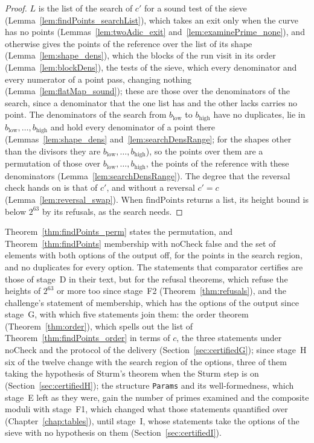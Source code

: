 \begin{proof}
  \leanok
  $L$ is the list of the search of $c'$ for a sound test of the sieve
  (Lemma~\ref{lem:findPoints_searchList}), which takes an exit only when the curve has no points
  (Lemmas~\ref{lem:twoAdic_exit} and~\ref{lem:examinePrime_none}), and otherwise gives the points of
  the reference over the list of its shape (Lemma~\ref{lem:shape_dens}), which the blocks of the run
  visit in its order (Lemma~\ref{lem:blockDens}), the tests of the sieve,
  which every denominator and every numerator of a point pass, changing nothing
  (Lemma~\ref{lem:flatMap_sound}); these are those over the denominators of the search, since a
  denominator that the one list has and the other lacks carries no point. The denominators of the
  search from $b_{\mathrm{low}}$ to $b_{\mathrm{high}}$ have no duplicates, lie in
  $b_{\mathrm{low}}, \dots, b_{\mathrm{high}}$ and hold every denominator of a point there
  (Lemmas~\ref{lem:shape_dens} and~\ref{lem:searchDensRange}; for the shapes other than the
  divisors they are $b_{\mathrm{low}}, \dots, b_{\mathrm{high}}$), so the points over them are a
  permutation of those over $b_{\mathrm{low}}, \dots, b_{\mathrm{high}}$, the points of the
  reference with these denominators (Lemma~\ref{lem:searchDensRange}). The degree that the reversal
  check hands on is that of $c'$, and without a reversal $c' = c$ (Lemma~\ref{lem:reversal_swap}).
  When $\mathrm{findPoints}$ returns a list, its height bound is below $2^{63}$ by its refusals, as
  the search needs.
\end{proof}

Theorem~\ref{thm:findPoints_perm} states the permutation, and Theorem~\ref{thm:findPoints}
membership with $\mathrm{noCheck}$ false and the set of elements with both options of the output
off, for the points in the search region, and no duplicates for every option. The statements that
comparator certifies are those of stage~D in their text, but for the refusal theorems, which refuse
the heights of $2^{63}$ or more too since stage~F2 (Theorem~\ref{thm:refusals}), and the challenge's
statement of membership, which has the options of the output since stage~G, with which five
statements join them: the order theorem (Theorem~\ref{thm:order}), which spells out the list of
Theorem~\ref{thm:findPoints_order} in terms of $c$, the three statements under $\mathrm{noCheck}$
and the protocol of the delivery (Section~\ref{sec:certifiedG}); since stage~H six of the twelve
change with the search region of the options, three of them taking the hypothesis of Sturm's theorem
when the Sturm step is on (Section~\ref{sec:certifiedH}); the structure \verb|Params| and its
well-formedness, which stage~E left as they were, gain the number of primes examined and the
composite moduli with stage~F1, which changed what those statements quantified over
(Chapter~\ref{chap:tables}), until stage~I, whose statements take the options of the sieve with no
hypothesis on them (Section~\ref{sec:certifiedI}).

